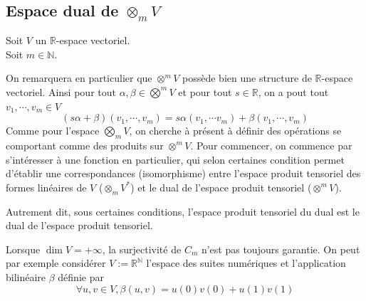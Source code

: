 \documentclass[../geometrie.tex]{subfiles}
\begin{document}
	\subsection{Espace dual de \texorpdfstring{$\otimes_{m} V$}{l'espace produit tensoriel}}{
		\noindent Soit $V$ un $\mathbb{R}$-espace vectoriel. \\
		\noindent Soit $m \in \mathbb{N}$.


		On remarquera en particulier que $\otimes^{m} V$ possède bien une structure de $\mathbb{R}$-espace vectoriel. Ainsi pour tout $\alpha, \beta \in \bigotimes^{m} V$ et pour tout $s \in \mathbb{R}$, on a pout tout $v_{1}, \cdots, v_{m} \in V$
		$$
			(s \alpha + \beta)(v_{1}, \cdots, v_{m}) = s \alpha(v_{1}, \cdots v_{m}) + \beta(v_{1}, \cdots, v_{m})
		$$
		Comme pour l'espace $\bigotimes_{m} V$, on cherche à présent à définir des opérations se comportant comme des produits sur $\otimes^{m} V$. Pour commencer, on commence par s'intéresser à une fonction en particulier, qui selon certaines condition permet d'établir une correspondances (isomorphisme) entre l'espace produit tensoriel des formes linéaires de $V$ ($\otimes_{m} V^{*}$) et le dual de l'espace produit tensoriel ($\otimes^{m} V$).

		Autrement dit, sous certaines conditions, l'espace produit tensoriel du dual est le dual de l'espace produit tensoriel.


		Lorsque $\dim V = +\infty$, la surjectivité de $C_{m}$ n'est pas toujours garantie. On peut par exemple considérer $V := \mathbb{R}^{\mathbb{N}}$ l'espace des suites numériques et l'application bilinéaire $\beta$ définie par
		$$
			\forall u, v \in V, \beta(u, v) = u(0) v(0) + u(1) v(1)
		$$

}
\end{document}
